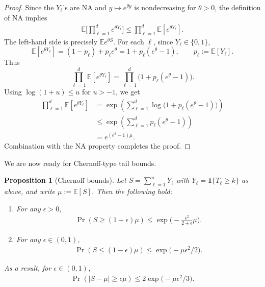 \documentclass[aps,prx,reprint,superscriptaddress,amsmath,amssymb,longbibliography,floatfix]{revtex4-2}
\newcommand{\dsE}{\mathbb{E}}
\theoremstyle{plain}
\newtheorem{proposition}[theorem]{Proposition}
\theoremstyle{definition}
\theoremstyle{remark}
\begin{document}
\begin{proof}
Since the $Y_\ell$'s are NA and $y\mapsto e^{\theta y}$ is nondecreasing for
$\theta>0$, the definition of NA implies
\begin{align*}
  \dsE \Big[\prod_{\ell=1}^d e^{\theta Y_\ell}\Big]
  \le \prod_{\ell=1}^d \dsE [e^{\theta Y_\ell} ].
\end{align*}
The left-hand side is precisely \(\dsE e^{\theta S}\).
For each \(\ell\), since \(Y_\ell\in\{0,1\}\),
\[
  \dsE [ e^{\theta Y_\ell} ]
  = (1-p_\ell)  + p_\ell e^{\theta}
  = 1 + p_\ell(e^{\theta}-1),
  \qquad p_\ell := \dsE [Y_\ell ].
\]
Thus
\[
  \prod_{\ell=1}^d \dsE [ e^{\theta Y_\ell} ]
  = \prod_{\ell=1}^d \big(1 + p_\ell(e^{\theta}-1)\big).
\]
Using \(\log(1+u)\le u\) for \(u>-1\), we get
\begin{align*}
\prod_{\ell=1}^d \dsE [ e^{\theta Y_\ell} ]
  &= \exp \left( \sum_{\ell=1}^d \log(1 + p_\ell(e^{\theta}-1)\big) \right)\\
  &\leq \exp \left( \sum_{\ell=1}^d p_\ell(e^{\theta}-1) \right)\\
  &= e^{(e^{\theta}-1)\mu}.
\end{align*}
Combination with the NA property completes the proof.
\end{proof}

We are now ready for Chernoff-type tail bounds.

\begin{proposition}[Chernoff bounds]\label{prop:Chernoff-S}
Let \(S = \sum_{\ell=1}^n Y_\ell\) with \(Y_\ell = \mathbf 1\{T_\ell\geq k\}\) as above,
and write \(\mu := \dsE [S] \).
Then the following hold:
\begin{enumerate}[label=(\roman*)]
  \item For any \(\epsilon>0\),
  \begin{align}
    \Pr(S \ge (1+\epsilon)\mu)
    \leq \exp\big(- \frac{\epsilon^2}{2+\epsilon} \mu\big).       
  \label{eq:app-negative-association-chernoff-upper}
\end{align}
  \item For any \(\epsilon\in(0,1)\),
  \begin{align}
    \Pr(S \le (1-\epsilon)\mu)
    \leq \exp\big(-\mu\epsilon^2/2\big).  
  \label{eq:app-negative-association-chernoff-lower}
\end{align}
\end{enumerate}
As a result, for $\epsilon\in ( 0, 1)$,
\begin{align}
     \Pr( |S - \mu| \ge \epsilon \mu)
    \leq 2\exp\big(- \mu\epsilon^2/3 \big).       
\label{eq:app-negative-association-chernoff-two-sided}
\end{align}
\end{proposition}
\end{document}
